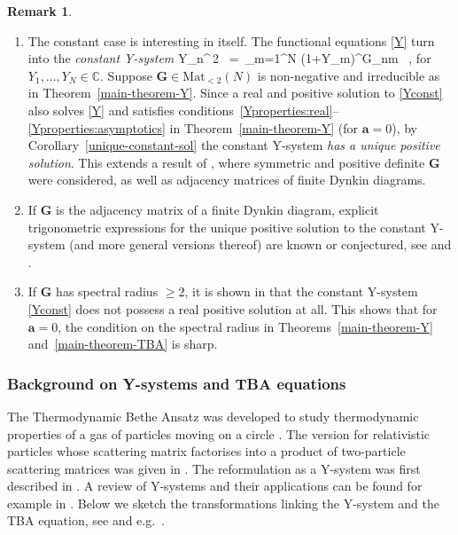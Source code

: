 \documentclass[12pt]{article}
\theoremstyle{plain}
\theoremstyle{definition}
\newtheorem{remark}[theorem]{Remark}
\numberwithin{equation}{section}
\numberwithin{theorem}{section}
\def\be#1\ee{\begin{equation}#1\end{equation}}
\renewcommand{\vec}[1]{\mathbf{#1}}
\begin{document}
\begin{remark}\label{remark-constantY}
~
\begin{enumerate}[label=\roman*)] \setlength{\leftskip}{-1em}
\item
The constant case is interesting in itself. The functional equations \eqref{Y} turn into the {\sl constant Y-system}
\be\label{Yconst}
	Y_n^{\,2}
~=~\prod_{m=1}^N \left(1+Y_m\right)^{G_{nm}}  \ ,
\ee
for $Y_1,\dots,Y_N \in \mathbb{C}$.
Suppose $\vec{G} \in \mathrm{Mat}_{<2}(N)$ is non-negative and irreducible as in Theorem~\ref{main-theorem-Y}.
Since a real and positive solution to \eqref{Yconst} also solves \eqref{Y}
and satisfies conditions~\ref{Yproperties:real}--\ref{Yproperties:asymptotics} 
in Theorem~\ref{main-theorem-Y} (for $\vec a =0$),
by Corollary~\ref{unique-constant-sol} the constant Y-system 
\textsl{has a unique positive solution}.
This extends a result of \cite{Nahm:2009hf,Inoue:2010a}, 
where symmetric and positive definite $\vec{G}$ were considered, as well as adjacency matrices of finite Dynkin diagrams.
\item
If $\vec{G}$ is the adjacency matrix of a finite Dynkin diagram,
explicit trigonometric expressions for the unique positive solution to 
the constant Y-system (and more general versions thereof)
are known or conjectured, see \cite{Kirillov:1989} and \cite[Sec.\,14]{KunibaNakanishiSuzuki}.
\item\label{spectralradius2isbad}
If $\vec{G}$ has spectral radius
	$\ge 2$, 
it is shown in \cite[Sec.\,4]{Tateo:DynkinTBAs} that the constant Y-system
\eqref{Yconst} does not possess a real positive solution at all.
This shows that for $\vec a=0$, the condition on the spectral radius in Theorems~\ref{main-theorem-Y} and~\ref{main-theorem-TBA} is sharp.
\end{enumerate}
\end{remark}



\subsubsection*{Background on Y-systems and TBA equations}

The Thermodynamic Bethe Ansatz 
was developed to study thermodynamic properties of a gas of particles moving on a circle \cite{YangYang69}. The version for relativistic particles  whose scattering matrix factorises into a product of two-particle scattering matrices was given in \cite{Zamolodchikov:1989cf}. The reformulation as a Y-system was first described in \cite{Zamo:ADE}. A review of Y-systems and their applications can be found for example in \cite{KunibaNakanishiSuzuki}. Below we sketch the transformations linking the Y-system and the TBA equation, see \cite{Zamo:ADE} and e.g.\ \cite{Tateo:DynkinTBAs,Dorey:2007zx,vanTongeren:TBAreview}.
\end{document}
